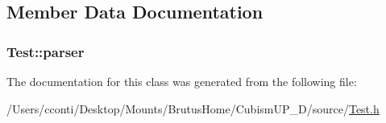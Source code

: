 \subsection{Member Data Documentation}
\hypertarget{class_test_a7ae39c6877dacf7748db311dd94fea03}{}
\subsubsection[{parser}]{ Test\+::parser\hspace{0.3cm}{\ttfamily [protected]}}\label{class_test_a7ae39c6877dacf7748db311dd94fea03}


The documentation for this class was generated from the following file\+:\begin{DoxyCompactItemize}
\item 
/\+Users/cconti/\+Desktop/\+Mounts/\+Brutus\+Home/\+Cubism\+U\+P\+\_\+D/source/\hyperlink{_test_8h}{Test.\+h}\end{DoxyCompactItemize}
